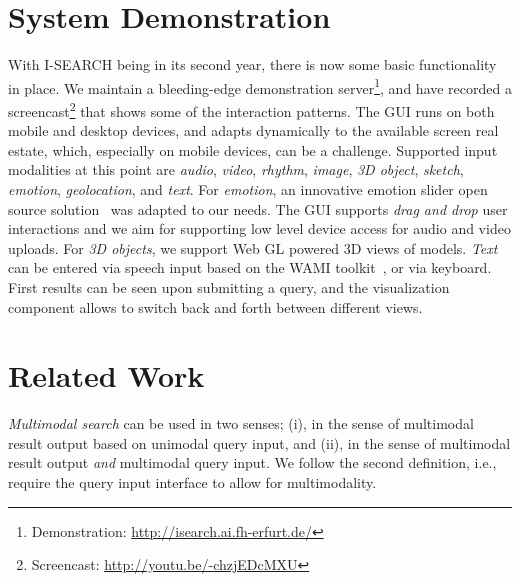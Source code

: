 \documentclass{www2012-comp-accepted}
\let\oldemph\emph
\renewcommand{\emph}[1]{\oldemph{\fontsize{9}{9}\selectfont #1}}
\newcommand{\inlinelistingsize}{\fontsize{8pt}{11pt}}
\let\oldurl\url
\renewcommand{\url}[1]{\inlinelistingsize\oldurl{#1}}
\begin{document}
\section{System Demonstration} \label{sec:systemdemonstration}
With \mbox{I-SEARCH} being in its second year, there is now some basic functionality in place.
We maintain a bleeding-edge demonstration server\footnote{Demonstration: \url{http://isearch.ai.fh-erfurt.de/}}, and have recorded a screencast\footnote{Screencast: \url{http://youtu.be/-chzjEDcMXU}} that shows some of the interaction patterns.
The GUI runs on both mobile and desktop devices, and adapts dynamically to the available screen real estate, which, especially on mobile devices, can be a challenge.
Supported input modalities at this point are \emph{audio}, \emph{video}, \emph{rhythm}, \emph{image}, \emph{3D object}, \emph{sketch}, \emph{emotion}, \emph{geolocation}, and \emph{text}.
For \emph{emotion}, an innovative emotion slider open source solution~\cite{emotionslider} was adapted to our needs.
The GUI supports \textit{drag and drop} user interactions and we aim for supporting low level device access for audio and video uploads.
For \emph{3D objects}, we support Web GL powered 3D views of models.
\emph{Text} can be entered via speech input based on the WAMI toolkit~\cite{wami}, or via keyboard.
First results can be seen upon submitting a query, and the visualization component allows to switch back and forth between different views.

\section{Related Work} \label{sec:relatedwork}
\emph{Multimodal search} can be used in two senses; (i), in the sense of multimodal result output based on unimodal query input, and (ii), in the sense of multimodal result output \emph{and} multimodal query input.
We follow the second definition, i.e., require the query input interface to allow for multimodality.
\end{document}
